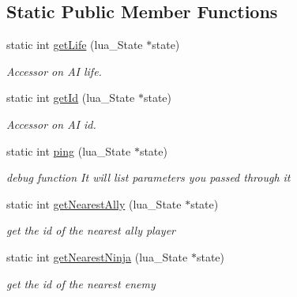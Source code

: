 \subsection*{Static Public Member Functions}
\begin{DoxyCompactItemize}
\item 
\mbox{\label{classIA_a1d8f2d91effd6eab9610763bb324d8cd}} 
static int \hyperlink{classIA_a1d8f2d91effd6eab9610763bb324d8cd}{get\+Life} (lua\+\_\+\+State $\ast$state)
\begin{DoxyCompactList}\small\item\em Accessor on AI life. \end{DoxyCompactList}\item 
\mbox{\label{classIA_abc157e865ccb6efd7335375fda49d786}} 
static int \hyperlink{classIA_abc157e865ccb6efd7335375fda49d786}{get\+Id} (lua\+\_\+\+State $\ast$state)
\begin{DoxyCompactList}\small\item\em Accessor on AI id. \end{DoxyCompactList}\item 
\mbox{\label{classIA_af8df32744539390d12d6748f0edf0311}} 
static int \hyperlink{classIA_af8df32744539390d12d6748f0edf0311}{ping} (lua\+\_\+\+State $\ast$state)
\begin{DoxyCompactList}\small\item\em debug function It will list parameters you passed through it \end{DoxyCompactList}\item 
\mbox{\label{classIA_aef22b49b556a328632d509f8336e715b}} 
static int \hyperlink{classIA_aef22b49b556a328632d509f8336e715b}{get\+Nearest\+Ally} (lua\+\_\+\+State $\ast$state)
\begin{DoxyCompactList}\small\item\em get the id of the nearest ally player \end{DoxyCompactList}\item 
\mbox{\label{classIA_affcf8babde7e30cbb605a75160465209}} 
static int \hyperlink{classIA_affcf8babde7e30cbb605a75160465209}{get\+Nearest\+Ninja} (lua\+\_\+\+State $\ast$state)
\begin{DoxyCompactList}\small\item\em get the id of the nearest enemy \end{DoxyCompactList}\item 

\end{DoxyCompactItemize}
